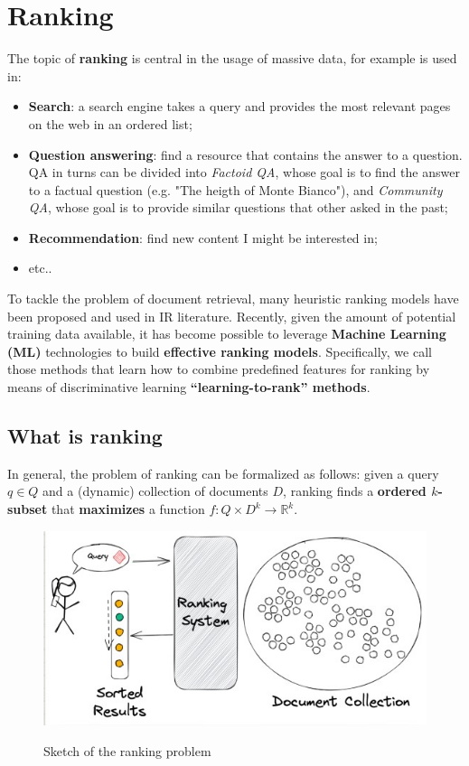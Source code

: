 \section{Ranking}\label{ch5}
The topic of \textbf{ranking} is central in the usage of massive data, for example is used in:

\begin{itemize}
    \item \textbf{Search}: a search engine takes a query and provides the most relevant pages on the web in an ordered list;
    \item \textbf{Question answering}: find a resource that contains the answer to a question. QA in turns can be divided into \textit{Factoid QA}, whose goal is to find the answer to a factual question (e.g. "The heigth of Monte Bianco"), and \textit{Community QA}, whose goal is to provide similar questions that other asked in the past;
    \item \textbf{Recommendation}: find new content I might be interested in;
    \item etc..
\end{itemize}

To tackle the problem of document retrieval, many heuristic ranking models have been proposed and used in IR literature. Recently, given the amount of potential training data available, it has become possible to leverage \textbf{Machine Learning (ML)} technologies to build \textbf{effective ranking models}. Specifically, we call those methods that learn how to combine predefined features for ranking by means of discriminative learning \textbf{“learning-to-rank” methods}.

\subsection{What is ranking}
In general, the problem of ranking can be formalized as follows: given a query $q \in Q$ and a (dynamic) collection of documents $D$, ranking finds a \textbf{ordered $k$-subset} that \textbf{maximizes} a function $f : Q \times D^k \to \mathbb{R}^k$.

\begin{figure}[h!]
		\centering
		\includegraphics[scale = 1.6]{img/ranking.jpg}
        \label{ranking}
        \caption{Sketch of the ranking problem}
\end{figure}


